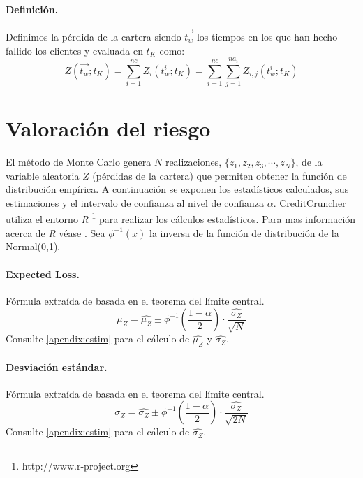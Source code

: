 \paragraph{Definici\'on.} Definimos la p\'erdida de la cartera siendo $\vec{t_w}$ 
los tiempos en los que han hecho fallido los clientes y evaluada en $t_K$ como:
\begin{equation}
Z(\vec{t_w};t_K) = \sum_{i=1}^{nc} Z_i(t_w^i;t_K) =
\sum_{i=1}^{nc} \sum_{j=1}^{na_i} Z_{i,j}(t_w^i;t_K)
\end{equation}


\section{Valoraci\'on del riesgo}
\label{res:risk}

El m\'etodo de Monte Carlo genera $N$ realizaciones, $\{z_1,z_2,z_3,\cdots,z_N\}$,
de la variable aleatoria $Z$ (p\'erdidas de la cartera) que permiten obtener la
funci\'on de distribuci\'on emp\'irica. A continuaci\'on se exponen los estad\'isticos
calculados, sus estimaciones y el intervalo de confianza al nivel de confianza $\alpha$.
CreditCruncher utiliza el entorno \emph{R} \footnote{http://www.r-project.org} para realizar
los c\'alculos estad\'isticos. Para mas informaci\'on acerca de \emph{R} v\'ease \cite{stats:R}.
Sea $\phi^{-1}(x)$ la inversa de la funci\'on de distribuci\'on de la Normal(0,1).

\paragraph{Expected Loss.} F\'ormula extra\'ida de \cite{stats:schaum}
basada en el teorema del l\'imite central.
\begin{displaymath}
\mu_Z = \widehat{\mu_Z} \pm \phi^{-1}\left(\frac{1-\alpha}{2}\right) \cdot \frac{\widehat{\sigma_Z}}{\sqrt{N}}
\end{displaymath}
Consulte \ref{apendix:estim} para el c\'alculo de $\widehat{\mu_Z}$ y $\widehat{\sigma_Z}$.

\paragraph{Desviaci\'on est\'andar.} F\'ormula extra\'ida de
\cite{stats:schaum} basada en el teorema del l\'imite central.
\begin{displaymath}
\sigma_Z = \widehat{\sigma_Z} \pm \phi^{-1}\left(\frac{1-\alpha}{2}\right) \cdot \frac{\widehat{\sigma_Z}}{\sqrt{2N}}
\end{displaymath}
Consulte \ref{apendix:estim} para el c\'alculo de $\widehat{\sigma_Z}$.


